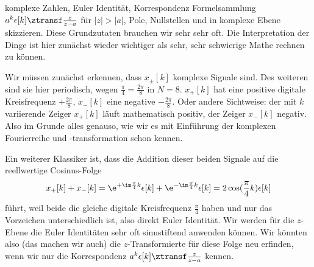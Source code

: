 \begin{Werkzeug}
komplexe Zahlen, Euler Identität,
Korrespondenz Formelsammlung $a^k \epsilon[k] \ztransf \frac{z}{z-a}$ für $|z|>|a|$,
Pole, Nullstellen und in komplexe Ebene skizzieren. Diese Grundzutaten brauchen wir
sehr sehr oft. Die Interpretation der Dinge ist hier zunächst wieder wichtiger
als sehr, sehr schwierige Mathe rechnen zu können.
\end{Werkzeug}
\begin{Ansatz}
Wir müssen zunächst erkennen, dass $x_\pm[k]$ komplexe Signale sind. Des weiteren
sind sie hier periodisch, wegen $\frac{\pi}{4}=\frac{2\pi}{8}$ in $N=8$.
$x_+[k]$ hat eine positive digitale Kreisfrequenz $+\frac{2\pi}{8}$, $x_-[k]$ eine negative $-\frac{2\pi}{8}$. Oder
andere Sichtweise: der mit $k$ variierende Zeiger $x_+[k]$ läuft mathematisch
positiv, der Zeiger $x_-[k]$ negativ. Also im Grunde alles genauso, wie wir
es mit Einführung der komplexen Fourierreihe und -transformation schon kennen.

Ein weiterer Klassiker ist, dass die Addition dieser beiden Signale auf
die reellwertige Cosinus-Folge
\begin{align}
x_+[k] + x_-[k]=
\e^{+\im\frac{\pi}{4} k} \epsilon[k] + \e^{-\im\frac{\pi}{4} k} \epsilon[k]
= 2 \cos(\frac{\pi}{4} k) \epsilon[k]
\end{align}
führt, weil beide die gleiche digitale Kreisfrequenz $\frac{\pi}{4}$ haben und
nur das Vorzeichen unterschiedlich ist, also direkt Euler Identität.
%
Wir werden für die $z$-Ebene die Euler Identitäten sehr oft sinnstiftend
anwenden können.
%
Wir könnten also (das machen wir auch) die $z$-Transformierte für diese Folge neu
erfinden, wenn wir nur die Korrespondenz $a^k \epsilon[k] \ztransf \frac{z}{z-a}$
kennen.
\end{Ansatz}
